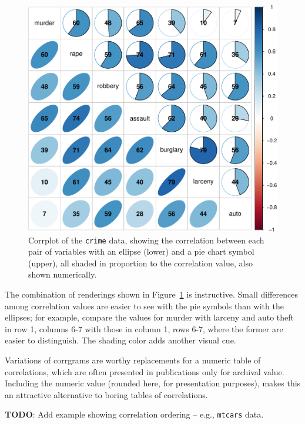 \documentclass[
  letterpaper,
  10pt,
  krantz2]{krantz}
\begin{document}
\begin{figure}[H]

{\centering \includegraphics[width=1\textwidth,height=\textheight]{figs/ch03/fig-crime-corrplot-1.pdf}

}

\caption{\label{fig-crime-corrplot}Corrplot of the \texttt{crime} data,
showing the correlation between each pair of variables with an ellipse
(lower) and a pie chart symbol (upper), all shaded in proportion to the
correlation value, also shown numerically.}

\end{figure}

The combination of renderings shown in Figure~\ref{fig-crime-corrplot}
is instructive. Small differences among correlation values are easier to
see with the pie symbols than with the ellipses; for example, compare
the values for murder with larceny and auto theft in row 1, columns 6-7
with those in column 1, rows 6-7, where the former are easier to
distinguish. The shading color adds another visual cue.

Variations of corrgrams are worthy replacements for a numeric table of
correlations, which are often presented in publications only for
archival value. Including the numeric value (rounded here, for
presentation purposes), makes this an attractive alternative to boring
tables of correlations.

\textbf{TODO}: Add example showing correlation ordering -- e.g.,
\texttt{mtcars} data.
\end{document}
